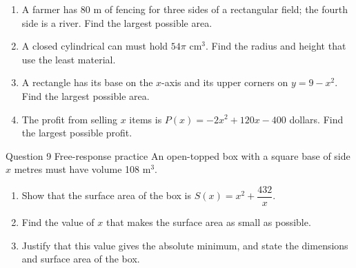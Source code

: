 \documentclass[11pt]{article}
\begin{document}
\begin{enumerate}[leftmargin=*,itemsep=2pt,start=5]
  \item A farmer has 80 m of fencing for three sides of a rectangular field; the fourth side is a river. Find the largest possible area.\work{2.8cm}
  \item A closed cylindrical can must hold $54\pi$ cm$^3$. Find the radius and height that use the least material.\work{2.8cm}
  \item A rectangle has its base on the $x$-axis and its upper corners on $y=9-x^2$. Find the largest possible area.\work{2.8cm}
  \item The profit from selling $x$ items is $P(x)=-2x^2+120x-400$ dollars. Find the largest possible profit.\work{2.8cm}
\end{enumerate}

\begin{frbox}{Question 9 \textperiodcentered{} Free-response practice}
An open-topped box with a square base of side $x$ metres must have volume 108 m$^3$.
\begin{enumerate}[label=(\alph*),leftmargin=*,itemsep=2pt]
  \item Show that the surface area of the box is $S(x)=x^2+\dfrac{432}{x}$.\work{2.6cm}
  \item Find the value of $x$ that makes the surface area as small as possible.\work{2.6cm}
  \item Justify that this value gives the absolute minimum, and state the dimensions and surface area of the box.\work{2.6cm}
\end{enumerate}
\end{frbox}
\end{document}

